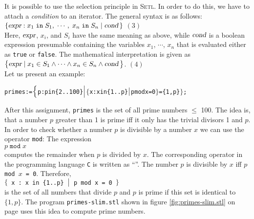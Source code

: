 It is possible to use the selection principle in  \textsc{Setl}.  In order to do this,
we have to attach a \emph{condition} to an iterator.  The general syntax is as follows:
\\[0.2cm]
\hspace*{1.3cm}  
$\{ \textsl{expr} : x_1 \;\mathtt{in}\; S_1,\; \cdots,\; x_n \;\mathtt{in}\; S_n \mid
\textsl{cond}\, \}$ 
\hspace*{\fill} $(3)$ 
\\[0.2cm]
Here, $\textsl{expr}$, $x_i$, and $S_i$ have the same meaning as above, while 
 $\textsl{cond}$ is a boolean expression presumable containing the variables $x_1$, $\cdots$,
 $x_n$ that is evaluated either as  \texttt{true} or \texttt{false}.  The mathematical
interpretation is given as \\[0.2cm]
\hspace*{1.3cm} 
$\bigl\{ \textsl{expr} \mid x_1 \in S_1 \wedge \cdots \wedge x_n \in S_n \wedge \textsl{cond} \,\bigr\}$. 
\hspace*{\fill} $(4)$ 
\\[0.2cm]
Let us present an example: 
\begin{alltt}
  primes := \(\Bigl\{\) p : p in  \{2..100\} \(\Bigm|\) \(\bigl\{\) x : x in \{1..p\} \(\bigm|\) p mod x = 0 \(\bigr\}\) = \{1, p\} \(\Bigr\}\);
\end{alltt}
After this assignment,  \texttt{primes} is the set of all prime numbers $\leq$ 100.
The idea is, that a number $p$ greater than 1 is prime iff it only has the trivial divisors 
1 and $p$.
In order to check whether a number  $p$ is divisible by a number $x$ we can use the operator
\texttt{mod}: The expression
\\[0.2cm]
\hspace*{1.3cm}
 $p \;\mathtt{mod}\; x$
\\[0.2cm]
computes the remainder when $p$ is divided by $x$.
The corresponding operator in the programming language \texttt{C} is written as
``\texttt{}''.
The number $p$ is divisible by  $x$ iff \texttt{$p$ mod $x$ = 0}.
Therefore, 
\\[0.2cm]
\hspace*{1.3cm} 
\texttt{$\bigl\{$ x : x in \{1..p\} $\bigm|$ p mod x = 0 $\bigr\}$} 
\\[0.2cm]
is the set of all numbers that divide $p$ and $p$ is prime if this set is identical to 
$\{1, p \}$.  The program \texttt{primes-slim.stl} shown in figure
\ref{fig:primes-slim.stl} on page \pageref{fig:primes-slim.stl} uses this idea to compute
prime numbers.

